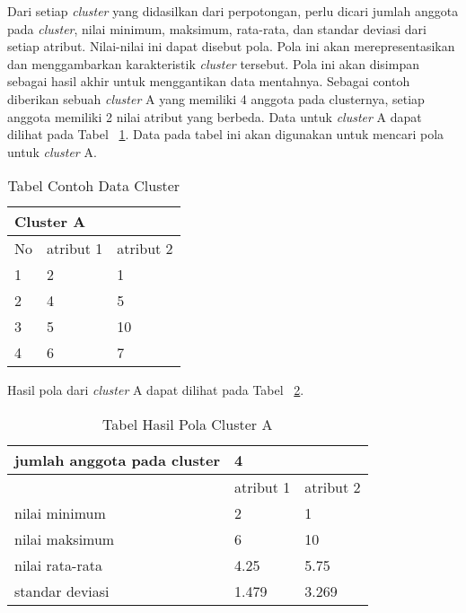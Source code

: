 Dari setiap \textit{cluster} yang didasilkan dari perpotongan, perlu dicari jumlah anggota pada \textit{cluster}, nilai minimum, maksimum, rata-rata, dan standar deviasi dari setiap atribut. Nilai-nilai ini dapat disebut pola. Pola ini akan merepresentasikan dan menggambarkan karakteristik \textit{cluster} tersebut. Pola ini akan disimpan sebagai hasil akhir untuk menggantikan data mentahnya. Sebagai contoh diberikan sebuah \textit{cluster} A yang memiliki 4 anggota pada clusternya, setiap anggota memiliki 2 nilai atribut yang berbeda. Data untuk \textit{cluster} A dapat dilihat pada Tabel  ~\ref{tab:cont1}. Data pada tabel ini akan digunakan untuk mencari pola untuk \textit{cluster} A.


\begin{table}[H]
    \centering 
    \caption{Tabel Contoh Data Cluster}
    \label{tab:cont1}
\begin{tabular}{|p{2cm}|p{2.2cm}|p{2.5cm}|}
\hline
\multicolumn{3}{|l|}{Cluster A}  \\
\hline
No & atribut 1 & atribut 2     \\
\hline
1  & 2         & 1             \\
\hline
2  & 4         & 5             \\
\hline
3  & 5         & 10            \\
\hline
4  & 6         & 7            \\
\hline
\end{tabular}
\end{table}

Hasil pola dari \textit{cluster} A dapat dilihat pada Tabel ~\ref{tab:cont2}.



\begin{table}[H]
\centering 
    \caption{Tabel Hasil Pola Cluster A}
    \label{tab:cont2}
\begin{tabular}{|p{5cm}|p{2.5cm}|p{2.5cm}|}
\hline
jumlah anggota pada cluster & \multicolumn{2}{l|}{4}  \\
\hline
                            & atribut 1 & atribut 2  \\
\hline
nilai minimum               & 2         & 1          \\
\hline
nilai maksimum              & 6         & 10          \\
\hline
nilai rata-rata             & 4.25      & 5.75        \\
\hline
standar deviasi             & 1.479        & 3.269 \\   
\hline     
\end{tabular}
\end{table}




